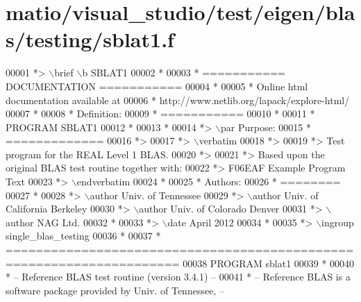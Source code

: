 \hypertarget{matio_2visual__studio_2test_2eigen_2blas_2testing_2sblat1_8f_source}{}\section{matio/visual\+\_\+studio/test/eigen/blas/testing/sblat1.f}
\label{matio_2visual__studio_2test_2eigen_2blas_2testing_2sblat1_8f_source}

\begin{DoxyCode}
00001 \textcolor{comment}{*> \(\backslash\)brief \(\backslash\)b SBLAT1}
00002 \textcolor{comment}{*}
00003 \textcolor{comment}{*  =========== DOCUMENTATION ===========}
00004 \textcolor{comment}{*}
00005 \textcolor{comment}{* Online html documentation available at }
00006 \textcolor{comment}{*            http://www.netlib.org/lapack/explore-html/ }
00007 \textcolor{comment}{*}
00008 \textcolor{comment}{*  Definition:}
00009 \textcolor{comment}{*  ===========}
00010 \textcolor{comment}{*}
00011 \textcolor{comment}{*       PROGRAM SBLAT1}
00012 \textcolor{comment}{* }
00013 \textcolor{comment}{*}
00014 \textcolor{comment}{*> \(\backslash\)par Purpose:}
00015 \textcolor{comment}{*  =============}
00016 \textcolor{comment}{*>}
00017 \textcolor{comment}{*> \(\backslash\)verbatim}
00018 \textcolor{comment}{*>}
00019 \textcolor{comment}{*>    Test program for the REAL Level 1 BLAS.}
00020 \textcolor{comment}{*>}
00021 \textcolor{comment}{*>    Based upon the original BLAS test routine together with:}
00022 \textcolor{comment}{*>    F06EAF Example Program Text}
00023 \textcolor{comment}{*> \(\backslash\)endverbatim}
00024 \textcolor{comment}{*}
00025 \textcolor{comment}{*  Authors:}
00026 \textcolor{comment}{*  ========}
00027 \textcolor{comment}{*}
00028 \textcolor{comment}{*> \(\backslash\)author Univ. of Tennessee }
00029 \textcolor{comment}{*> \(\backslash\)author Univ. of California Berkeley }
00030 \textcolor{comment}{*> \(\backslash\)author Univ. of Colorado Denver }
00031 \textcolor{comment}{*> \(\backslash\)author NAG Ltd. }
00032 \textcolor{comment}{*}
00033 \textcolor{comment}{*> \(\backslash\)date April 2012}
00034 \textcolor{comment}{*}
00035 \textcolor{comment}{*> \(\backslash\)ingroup single\_blas\_testing}
00036 \textcolor{comment}{*}
00037 \textcolor{comment}{*  =====================================================================}
00038       \textcolor{keyword}{PROGRAM} sblat1
00039 \textcolor{comment}{*}
00040 \textcolor{comment}{*  -- Reference BLAS test routine (version 3.4.1) --}
00041 \textcolor{comment}{*  -- Reference BLAS is a software package provided by Univ. of Tennessee,    --}

\end{DoxyCode}
